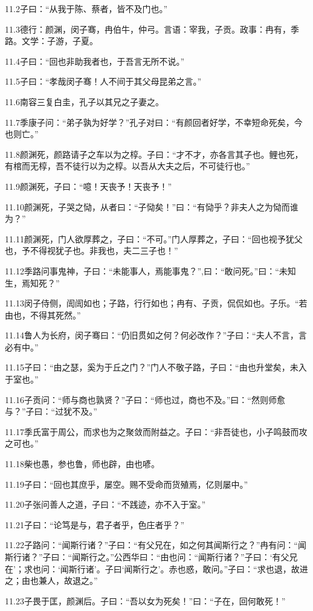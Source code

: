 \documentclass[a4paper,12pt,UTF8,twoside]{ctexbook}
\begin{document}
11.2子曰：“从我于陈、蔡者，皆不及门也。”

11.3德行：颜渊，闵子骞，冉伯牛，仲弓。言语：宰我，子贡。政事：冉有，季路。文学：子游，子夏。

11.4子曰：“回也非助我者也，于吾言无所不说。”

11.5子曰：“孝哉闵子骞！人不间于其父母昆弟之言。”

11.6南容三复白圭，孔子以其兄之子妻之。

11.7季康子问：“弟子孰为好学？”孔子对曰：“有颜回者好学，不幸短命死矣，今也则亡。”

11.8颜渊死，颜路请子之车以为之椁。子曰：“才不才，亦各言其子也。鲤也死，有棺而无椁，吾不徒行以为之椁。以吾从大夫之后，不可徒行也。”

11.9颜渊死，子曰：“噫！天丧予！天丧予！”

11.10颜渊死，子哭之恸，从者曰：“子恸矣！”曰：“有恸乎？非夫人之为恸而谁为？”

11.11颜渊死，门人欲厚葬之，子曰：“不可。”门人厚葬之，子曰：“回也视予犹父也，予不得视犹子也。非我也，夫二三子也！”

11.12季路问事鬼神，子曰：“未能事人，焉能事鬼？”,曰：“敢问死。”曰：“未知生，焉知死？”

11.13闵子侍侧，訚訚如也；子路，行行如也；冉有、子贡，侃侃如也。子乐。“若由也，不得其死然。”

11.14鲁人为长府，闵子骞曰：“仍旧贯如之何？何必改作？”子曰：“夫人不言，言必有中。”

11.15子曰：“由之瑟，奚为于丘之门？”门人不敬子路，子曰：“由也升堂矣，未入于室也。”

11.16子贡问：“师与商也孰贤？”子曰：“师也过，商也不及。”曰：“然则师愈与？”子曰：“过犹不及。”

11.17季氏富于周公，而求也为之聚敛而附益之。子曰：“非吾徒也，小子鸣鼓而攻之可也。”

11.18柴也愚，参也鲁，师也辟，由也喭。

11.19子曰：“回也其庶乎，屡空。赐不受命而货殖焉，亿则屡中。”

11.20子张问善人之道，子曰：“不践迹，亦不入于室。”

11.21子曰：“论笃是与，君子者乎，色庄者乎？”

11.22子路问：“闻斯行诸？”子曰：“有父兄在，如之何其闻斯行之？”冉有问：“闻斯行诸？”子曰：“闻斯行之。”公西华曰：“由也问：“闻斯行诸？”子曰：‘有父兄在’；求也问：‘闻斯行诸’。子曰‘闻斯行之’。赤也惑，敢问。”子曰：“求也退，故进之；由也兼人，故退之。”

11.23子畏于匡，颜渊后。子曰：“吾以女为死矣！”曰：“子在，回何敢死！”
\end{document}
